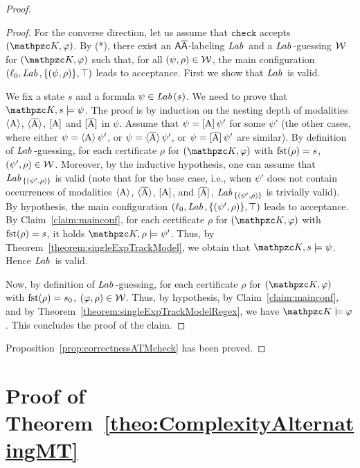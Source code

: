 \begin{proof}
\begin{proof}
For the converse direction, let us assume that $\texttt{check}$ accepts $(\Ku,\varphi)$. By (*), there exist an $\mathsf{A\overline{A}}$-labeling $\textit{Lab}\,$ and a $\textit{Lab}\,$-guessing ${\mathcal{W}}$  for $(\Ku,\varphi)$  such that, for all $(\psi,\rho)\in {\mathcal{W}}$, the main configuration $(\ell_0,\textit{Lab}\,,\{(\psi,\rho)\},\operatorname{\top})$ leads to acceptance.
First we show that $\textit{Lab}\,$ is valid. 

We fix a state $s$ and a formula $\psi\in \textit{Lab}\,(s)$. We need to prove that $\Ku,s\models \psi$. The proof is by induction
on the nesting depth of modalities $\operatorname{\langle A\rangle}$, $\operatorname{\langle \overline{A}\rangle}$, $\operatorname{\mathopen[ A \mathclose]}$ and $\operatorname{\mathopen[ \overline{A} \mathclose]}$ in $\psi$. Assume that
$\psi=\operatorname{\mathopen[ A \mathclose]}\psi'$ for some $\psi'$ (the other cases, where either $\psi=\operatorname{\langle A\rangle}\psi'$, or $\psi=\operatorname{\langle \overline{A}\rangle}\psi'$, or   $\psi=\operatorname{\mathopen[ \overline{A} \mathclose]}\psi'$ are similar).
By definition of $\textit{Lab}\,$-guessing, for each certificate $\rho$   for $(\Ku,\varphi)$ with $\operatorname{fst}(\rho)=s$, $(\psi',\rho)\in {\mathcal{W}}$. Moreover, by the inductive hypothesis,
one can assume that $\textit{Lab}\,_{\{(\psi',\rho)\}}$ is valid (note that for the base case, i.e., when $\psi'$ does not contain occurrences of modalities $\operatorname{\langle A\rangle}$, $\operatorname{\langle \overline{A}\rangle}$, $\operatorname{\mathopen[ A \mathclose]}$, and $\operatorname{\mathopen[ \overline{A} \mathclose]}$, $\textit{Lab}\,_{\{(\psi',\rho)\}}$ is trivially valid). By hypothesis, the main configuration
$(\ell_0,\textit{Lab}\,,\{(\psi',\rho)\},\operatorname{\top})$ leads  to acceptance.
By Claim~\ref{claim:mainconf}, 
for each certificate $\rho$  for $(\Ku,\varphi)$ with $\operatorname{fst}(\rho)=s$, it holds $\Ku,\rho\models \psi'$. Thus, by Theorem~\ref{theorem:singleExpTrackModel}, we obtain that
$\Ku,s\models \psi$. Hence $\textit{Lab}\,$ is valid. 

Now, by definition of $\textit{Lab}\,$-guessing, for each certificate $\rho$ for $(\Ku,\varphi)$ with $\operatorname{fst}(\rho)=s_0$, $(\varphi,\rho)\in{\mathcal{W}}$.
Thus, by hypothesis, by Claim~\ref{claim:mainconf}, and by Theorem~\ref{theorem:singleExpTrackModelRegex}, we have $\Ku\models \varphi$.
This concludes the proof of the claim.
\end{proof}

Proposition~\ref{prop:correctnessATMcheck} has been proved.
\end{proof}


\section{Proof of Theorem~\ref{theo:ComplexityAlternatingMT}}\label{proof:theo:ComplexityAlternatingMT}

\def\tape{\text{{\sffamily tape}}}
\def\row{\text{{\sffamily row}}}
\def\symb{\text{{\sffamily symb}}}
\def\state{\text{{\sffamily state}}}
\def\succ{\text{{\sffamily next}}}
\def\prev{\text{{\sffamily prev}}}
\def\last{\text{{\sffamily last}}}
\def\first{\text{{\sffamily first}}}
\def\Q{\text{{\sffamily Q}}}
\newcommand{\rej}{\textit{rej}}


